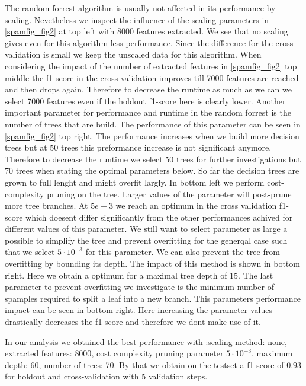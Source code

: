 \documentclass[11pt]{article}
\begin{document}
%
The random forrest algorithm is usually not affected in its performance by scaling. Nevetheless we inspect the influence of the scaling parameters in \ref{spamfig_fig2} at top left with 8000 features extracted. We see that no scaling gives even for this algorithm less performance. Since the difference for the cross-validation is small we keep the unscaled data for this algorithm. When considering the impact of the number of extracted features in \ref{spamfig_fig2} top middle the f1-score in the cross validation improves till 7000 features are reached and then drops again. Therefore to decrease the runtime as much as we can we select 7000 features even if the holdout f1-score here is clearly lower. Another important parameter for performance and runtime in the random forrest is the number of trees that are build. The performance of this parameter can be seen in \ref{spamfig_fig2} top right. The performance increases when we build more decision trees but at 50 trees this preformance increase is not significant anymore. Therefore to decrease the runtime we select 50 trees for further investigations but 70 trees when stating the optimal parameters below. So far the decision trees are grown to full lenght and might overfit largly. In \label{spamfig_fig2} bottom left we perform cost-complexity pruning on the tree. Larger values of the parameter will post-prune more tree branches. At $5e-3$ we reach an optimum in the cross validation f1-score which doesent differ significantly from the other performances achived for different values of this parameter. We still want to select parameter as large a possible to simplify the tree and prevent overfitting for the generqal case such that we select $5\cdot10^{-3}$ for this parameter. We can also prevent the tree from overfitting by bounding its depth. The impact of this method is shown in \label{spamfig_fig2} bottom right. Here we obtain a optimum for a maximal tree depth of $15$. The last parameter to prevent overfitting we investigate is the minimum number of spamples required to split a leaf into a new branch. This parameters performance impact can be seen in \label{spamfig_fig2} bottom right. Here increasing the parameter values drastically decreases the f1-score and therefore we dont make use of it.

In our analysis we obtained the best performance with :scaling method: none, extracted features: $8000$, cost complexity pruning parameter $5\cdot10^{-3}$, maximum depth: $60$, number of trees: 70. By that we obtain on the testset a f1-score of $0.93$ for holdout and cross-validation with 5 validation steps.
\end{document}
